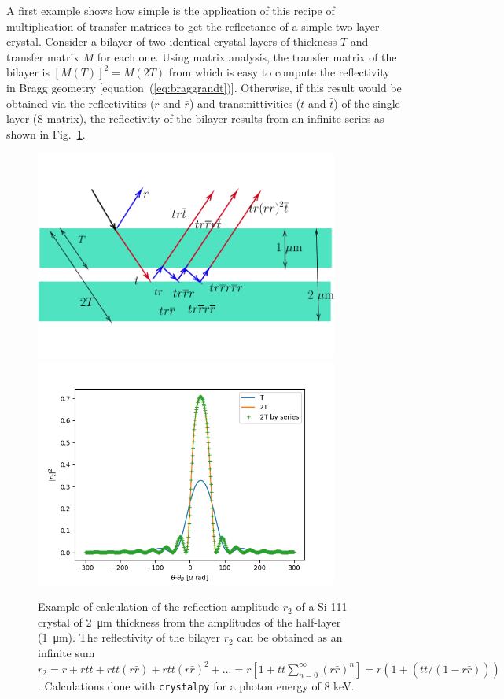 \documentclass{iucr}
\begin{document}
A first example shows how simple is the application of this recipe of multiplication of transfer matrices to get the reflectance of a simple two-layer crystal. Consider
a bilayer of two identical crystal layers of thickness $T$ and transfer matrix $M$ for each one. Using matrix analysis, the transfer matrix of the bilayer is $[M(T)]^2=M(2T)$ from which is easy to compute the reflectivity in Bragg geometry [equation~(\ref{eq:braggrandt})]. Otherwise, if this result would be obtained via the reflectivities ($r$ and $\bar{r}$) and transmittivities ($t$ and $\bar{t}$) of the single layer (S-matrix), the reflectivity of the bilayer results from an infinite series as shown in  Fig.~\ref{fig:doublelayer}.
 
\begin{figure}\label{fig:doublelayer}
    \centering
    \includegraphics[width=0.89\textwidth]{figures/figlayered2.pdf}
    \includegraphics[width=0.89\textwidth]{figures/doublelayer2.png}
    \caption{Example of calculation of the reflection amplitude $r_2$ of a Si 111 crystal of \SI{2}{\micro\meter} thickness from the amplitudes of the half-layer (\SI{1}{\micro\meter}). The reflectivity of the bilayer $r_2$ can be obtained as an infinite sum $r_2 = r + r t \bar{t} + r t \bar{t} (r \bar{r}) + r t \bar{t} (r \bar{r})^2 + ...= r[1 + t \bar{t}\sum_{n=0}^{\infty}(r\bar{r})^n]=r(1 + (t \bar{t} / (1-r \bar{r})))$. Calculations done with {\tt crystalpy} for a photon energy of 8 keV.}
\end{figure}
\end{document}
